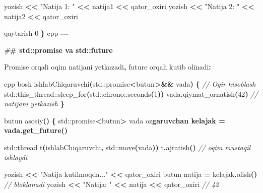 \documentclass[a4paper,11pt,twoside,openright]{book}
\newenvironment{Shaded}{\begin{snugshade}}{\end{snugshade}}
\newcommand{\BuiltInTok}[1]{#1}
\newcommand{\CharTok}[1]{\textcolor[rgb]{0.31,0.60,0.02}{#1}}
\newcommand{\CommentTok}[1]{\textcolor[rgb]{0.56,0.35,0.01}{\textit{#1}}}
\newcommand{\DecValTok}[1]{\textcolor[rgb]{0.00,0.00,0.81}{#1}}
\newcommand{\ErrorTok}[1]{\textcolor[rgb]{0.64,0.00,0.00}{\textbf{#1}}}
\newcommand{\NormalTok}[1]{#1}
\newcommand{\OperatorTok}[1]{\textcolor[rgb]{0.81,0.36,0.00}{\textbf{#1}}}
\newcommand{\PreprocessorTok}[1]{\textcolor[rgb]{0.56,0.35,0.01}{\textit{#1}}}
\newcommand{\StringTok}[1]{\textcolor[rgb]{0.31,0.60,0.02}{#1}}
\begin{document}
\begin{Shaded}
\begin{Highlighting}[]
\NormalTok{    yozish }\OperatorTok{\textless{}\textless{}} \StringTok{"Natija 1: "} \OperatorTok{\textless{}\textless{}}\NormalTok{ natija1 }\OperatorTok{\textless{}\textless{}}\NormalTok{ qator\_oxiri}
\NormalTok{    yozish }\OperatorTok{\textless{}\textless{}} \StringTok{"Natija 2: "} \OperatorTok{\textless{}\textless{}}\NormalTok{ natija2 }\OperatorTok{\textless{}\textless{}}\NormalTok{ qator\_oxiri}

\NormalTok{    qaytarish }\DecValTok{0}
\OperatorTok{\}}
\ErrorTok{\textasciigrave{}\textasciigrave{}\textasciigrave{}}\NormalTok{cpp}
\OperatorTok{{-}{-}{-}}

\PreprocessorTok{\#}\ErrorTok{\# \textasciigrave{}std::promise\textasciigrave{} va \textasciigrave{}std::future\textasciigrave{}}

\NormalTok{Promise orqali oqim natijani yetkazadi}\OperatorTok{,}\NormalTok{ future orqali kutib olinadi}\OperatorTok{:}

\ErrorTok{\textasciigrave{}\textasciigrave{}\textasciigrave{}}\NormalTok{cpp}
\NormalTok{bosh ishlabChiqaruvchi}\OperatorTok{(}\BuiltInTok{std::}\NormalTok{promise}\OperatorTok{\textless{}}\NormalTok{butun}\OperatorTok{\textgreater{}\&\&}\NormalTok{ vada}\OperatorTok{)} \OperatorTok{\{}
    \CommentTok{// Og\textquotesingle{}ir hisoblash}
    \BuiltInTok{std::}\NormalTok{this\_thread::sleep\_for}\OperatorTok{(}\BuiltInTok{std::}\NormalTok{chrono::seconds}\OperatorTok{(}\DecValTok{1}\OperatorTok{))}
\NormalTok{    vada}\OperatorTok{.}\NormalTok{qiymat\_ornatish}\OperatorTok{(}\DecValTok{42}\OperatorTok{)}   \CommentTok{// natijani yetkazish}
\OperatorTok{\}}

\NormalTok{butun asosiy}\OperatorTok{()} \OperatorTok{\{}
    \BuiltInTok{std::}\NormalTok{promise}\OperatorTok{\textless{}}\NormalTok{butun}\OperatorTok{\textgreater{}}\NormalTok{ vada}
\NormalTok{    o}\CharTok{\textquotesingle{}z}\ErrorTok{garuvchan kelajak = vada.get\_future()}

    \BuiltInTok{std::}\NormalTok{thread t}\OperatorTok{(}\NormalTok{ishlabChiqaruvchi}\OperatorTok{,} \BuiltInTok{std::}\NormalTok{move}\OperatorTok{(}\NormalTok{vada}\OperatorTok{))}
\NormalTok{    t}\OperatorTok{.}\NormalTok{ajratish}\OperatorTok{()}   \CommentTok{// oqim mustaqil ishlaydi}

\NormalTok{    yozish }\OperatorTok{\textless{}\textless{}} \StringTok{"Natija kutilmoqda..."} \OperatorTok{\textless{}\textless{}}\NormalTok{ qator\_oxiri}
\NormalTok{    butun natija }\OperatorTok{=}\NormalTok{ kelajak}\OperatorTok{.}\NormalTok{olish}\OperatorTok{()}   \CommentTok{// bloklanadi}
\NormalTok{    yozish }\OperatorTok{\textless{}\textless{}} \StringTok{"Natija: "} \OperatorTok{\textless{}\textless{}}\NormalTok{ natija }\OperatorTok{\textless{}\textless{}}\NormalTok{ qator\_oxiri   }\CommentTok{// 42}


\end{Highlighting}
\end{Shaded}
\end{document}

